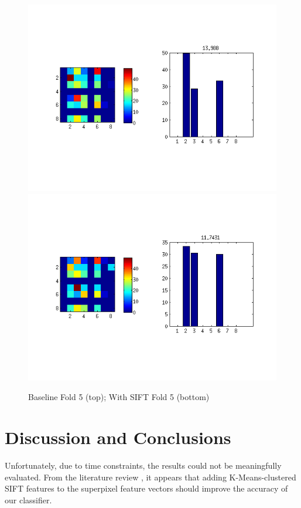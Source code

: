 \documentclass[10pt,twocolumn,letterpaper]{article}
\begin{document}
\begin{figure}[p]
 \centering
 \includegraphics[scale=0.5]{../../../evaluation/baseline/fold5_1e5.png}
 \includegraphics[scale=0.5]{../../../evaluation/feature-sift/fold5_1e5.png}
 \caption{Baseline Fold 5 (top); With SIFT Fold 5 (bottom)}
 \label{figure:withSiftFold5}
\end{figure}


\section{Discussion and Conclusions}

Unfortunately, due to time constraints, the results could not be meaningfully evaluated. From the literature review \cite{luo}, it appears that adding K-Means-clustered SIFT features to the superpixel feature vectors should improve the accuracy of our classifier.
\end{document}
